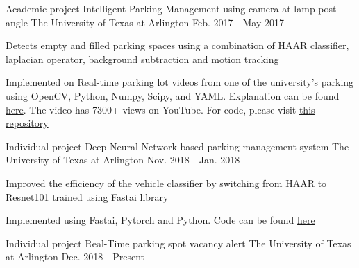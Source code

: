 \vspace*{0.02in}
\begin{cventries}
	\cventry
    	{Academic project} %
    	{Intelligent Parking Management using camera at lamp-post angle}
    	{The University of Texas at Arlington} %
    	{Feb. 2017 - May 2017} %
    	{
      		\begin{cvitems} %
        		\item {Detects empty and filled parking spaces  using a combination of HAAR classifier, laplacian operator, background subtraction and motion tracking} 
        		\item {Implemented on Real-time parking lot videos from one of the university's parking using OpenCV, Python, Numpy, Scipy, and YAML. Explanation can be found \href{https://youtu.be/y1M5dNkvCJc}{here}. The video has 7300+  views on YouTube. For code, please visit \href{https://github.com/ankit1khare/Automatic-Parking-Management}{this  repository}}
        		\vspace*{0.01in}
        	\end{cvitems}
        }		
	\cventry    		
		{Individual project}
		{Deep Neural Network based parking management system}        			{The University of Texas at Arlington}
		{Nov. 2018 - Jan. 2018}
		{
			\begin{cvitems}
        		\item {Improved the efficiency of the vehicle classifier by switching from HAAR to Resnet101 trained using Fastai library} 
        		\item {Implemented using Fastai, Pytorch and Python. Code can be found \href{https://github.com/ankit1khare/Deep-Neural-Network-based-parking-system}{here}}  
        		\vspace*{0.09in}
      		\end{cvitems}
    	}
    \cventry    		
		{Individual project}
		{Real-Time parking spot vacancy alert}        			
		{The University of Texas at Arlington}
		{Dec. 2018 - Present}
		{
			\begin{cvitems}

\end{cvitems}}
\end{cventries}
